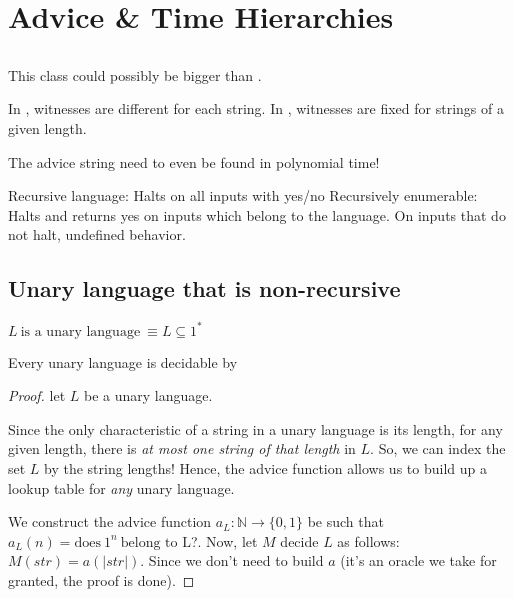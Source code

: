 \chapter{Advice \& Time Hierarchies}

\section{\ppoly}

This class could possibly be bigger than \ptime.

In \nptime, witnesses are different for each string. In \ppoly, witnesses
are fixed for strings of a given length.

The advice string need to even be found in polynomial time!

Recursive language: Halts on all inputs with yes/no
Recursively enumerable: Halts and returns yes on inputs which belong to the language.
On inputs that do not halt, undefined behavior.

\section{Unary language that is non-recursive}

$L~\text{is a unary language}~\equiv L \subseteq 1^*$

\begin{theorem}
Every unary language is decidable by \ppoly 
\end{theorem}
\begin{proof}
let $L$ be a unary language.

Since the only characteristic of a string in a unary language is its length,
for any given length, there is \textit{at most one string of that length}
in $L$. So, we can index the set $L$ by the string lengths! Hence, the
advice function allows us to build up a lookup table for \textit{any} unary
language.


 We construct the advice function $a_L: \mathbb{N} \to \{0, 1\}$ be such that
$a_L(n) = \text{does}~1^n~\text{belong to L}$?. Now, let $M$ decide $L$
as follows: $M(str) = a(|str|)$. Since we don't need to build $a$ (it's an
oracle we take for granted, the proof is done).
\end{proof}

